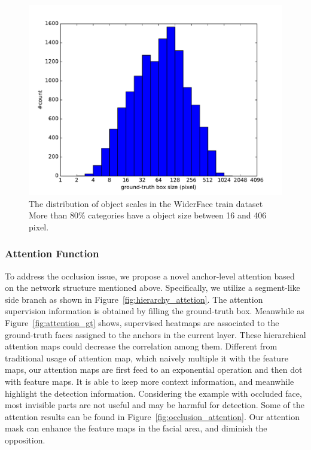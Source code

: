 \documentclass[10pt,twocolumn,letterpaper]{article}
\begin{document}
\begin{figure}[h]
\begin{center}
    \includegraphics[width=0.8\linewidth]{widerface_gtbox.pdf}
\end{center}
    \caption{The distribution of object scales in the WiderFace train dataset More than 80\% categories have a object
size between 16 and 406 pixel.}
\label{fig:widerface}
\end{figure}



\subsubsection{Attention Function\label{sec:attention func}}

To address the occlusion issue, we propose a novel anchor-level attention based on the network structure mentioned above. Specifically, we utilize a segment-like side branch as shown in Figure~\ref{fig:hierarchy_attetion}. The attention supervision information is obtained by filling the ground-truth box. Meanwhile as Figure~\ref{fig:attention_gt} shows, supervised heatmaps are associated to the ground-truth faces assigned to the anchors in the current layer. These hierarchical attention maps could decrease the correlation among them. Different from traditional usage of attention map, which naively multiple it with the feature maps, our attention maps are first feed to an exponential operation and then dot with feature maps. It is able to keep more context information, and meanwhile highlight the detection information. Considering the example with occluded face, most invisible parts are not useful and may be harmful for detection. Some of the attention results can be found in Figure~\ref{fig:occlusion_attention}. Our attention mask can enhance the feature maps in the facial area, and diminish the opposition.
\end{document}
